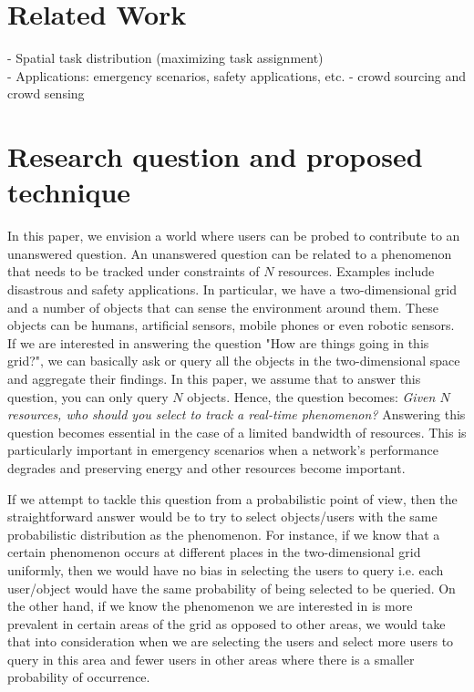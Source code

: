 \documentclass{acm_proc_article-sp}
\begin{document}
\section{Related Work}
- Spatial task distribution (maximizing task assignment)\\
- Applications: emergency scenarios, safety applications, etc. 
- crowd sourcing and crowd sensing

\section{Research question and proposed technique}
In this paper, we envision a world where users can be probed to contribute to an unanswered question. An unanswered question can be related to a phenomenon that needs to be tracked under  constraints of $N$ resources. Examples include disastrous and safety applications. In particular, we have a two-dimensional grid and a number of objects that can sense the environment around them. These objects can be humans, artificial sensors, mobile phones or even robotic sensors. If we are interested in answering the question "How are things going in this grid?", we can basically ask or query all the objects in the two-dimensional space and aggregate their findings. In this paper, we assume that to answer this question, you can only query $N$ objects. Hence, the question becomes: \textit{Given $N$ resources, who should you select to track a real-time phenomenon?} Answering this question becomes essential in the case of a limited bandwidth of resources. This is particularly important in emergency scenarios when a network's performance degrades and preserving energy and other resources become important.\par
If we attempt to tackle this question from a probabilistic point of view, then the straightforward answer would be to try to select objects/users with the same probabilistic distribution as the phenomenon. For instance, if we know that a certain phenomenon occurs at different places in the two-dimensional grid uniformly, then we would have no bias in selecting the users to query i.e. each user/object would have the same probability of being selected to be queried. On the other hand, if we know the phenomenon we are interested in is more prevalent in certain areas of the grid as opposed to other areas, we would take that into consideration when we are selecting the users and select more users to query in this area and fewer users in other areas where there is a smaller probability of occurrence.\par
\end{document}
